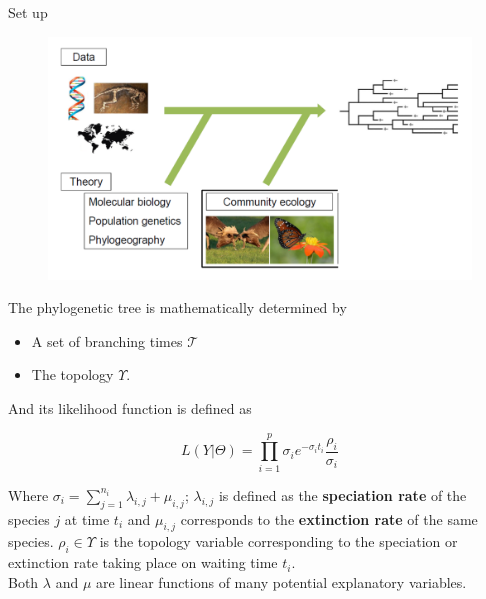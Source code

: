 \documentclass[final]{beamer}
\newlength{\onecolwid}
\begin{document}
\begin{frame}[t]
\begin{columns}[t]
\begin{column}{\onecolwid}
           \begin{block}{Set up}
       
       \begin{figure}
                    \includegraphics[width=.9\linewidth]{figures/datatree.png}
		\end{figure}   
          
The phylogenetic tree is mathematically determined by

\begin{itemize}
	\item A set of branching times $\mathcal{T}$%
	\item The topology  $\Upsilon$.%
\end{itemize}

And its likelihood function is defined as 

	\begin{equation} L( Y | \Theta) = \displaystyle\prod_{i=1}^p \sigma_i e^{-\sigma_i t_i} \frac{\rho_{i}}{\sigma_i}  
 		\label{llik}
 		\end{equation}
 		
	
Where $\sigma_i = \sum_{j=1}^{n_i} \lambda_{i,j} +\mu_{i,j} $; $\lambda_{i,j}$ is defined as the {\bf speciation rate} of the species $j$ at time $t_i$ and $\mu_{i,j}$ corresponds to the {\bf extinction rate} of the same species. $\rho_i \in \Upsilon$ is the topology variable corresponding to the speciation or extinction rate taking place on waiting time $t_i$. \\
Both $\lambda$ and $\mu$ are linear functions of many potential explanatory variables.
%


\end{block}
\end{column}
\end{columns}
\end{frame}
\end{document}
